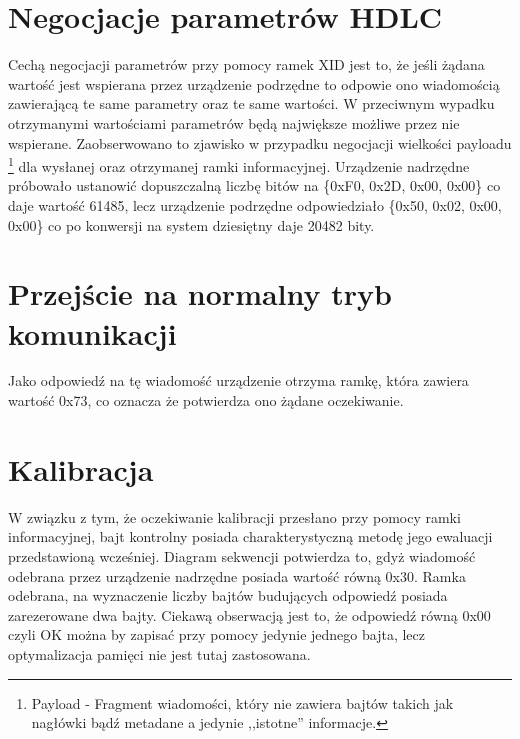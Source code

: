     \section{Negocjacje parametrów HDLC}
    Cechą negocjacji parametrów przy pomocy ramek XID jest to, że jeśli żądana wartość jest wspierana przez
    urządzenie podrzędne to odpowie ono wiadomością zawierającą te same parametry oraz te same wartości. 
    W przeciwnym wypadku otrzymanymi wartościami parametrów będą największe możliwe przez nie wspierane.
    Zaobserwowano to zjawisko w przypadku negocjacji wielkości payloadu
    \footnote{\label{Payload} Payload - Fragment wiadomości, który nie zawiera bajtów takich jak nagłówki bądź metadane a jedynie ,,istotne''
    informacje.} dla wysłanej oraz otrzymanej ramki informacyjnej.
    Urządzenie nadrzędne próbowało ustanowić dopuszczalną liczbę bitów na \{0xF0, 0x2D, 0x00, 0x00\} co daje wartość 61485,
    lecz urządzenie podrzędne odpowiedziało \{0x50, 0x02, 0x00, 0x00\} co po konwersji na system dziesiętny daje 20482 bity.

    \section{Przejście na normalny tryb komunikacji}
    Jako odpowiedź na tę wiadomość urządzenie otrzyma ramkę, która zawiera wartość 0x73, co oznacza że 
    potwierdza ono żądane oczekiwanie.

    \section{Kalibracja}
    W związku z tym, że oczekiwanie kalibracji przesłano przy pomocy ramki informacyjnej, bajt kontrolny posiada
    charakterystyczną metodę jego ewaluacji przedstawioną wcześniej. Diagram sekwencji
    potwierdza to, gdyż wiadomość odebrana przez urządzenie nadrzędne posiada wartość równą 0x30.
    Ramka odebrana, na wyznaczenie liczby bajtów budujących odpowiedź posiada zarezerowane dwa bajty. 
    Ciekawą obserwacją jest to, że odpowiedź równą 0x00 czyli OK można by zapisać przy pomocy jedynie jednego bajta, lecz optymalizacja
    pamięci nie jest tutaj zastosowana.

